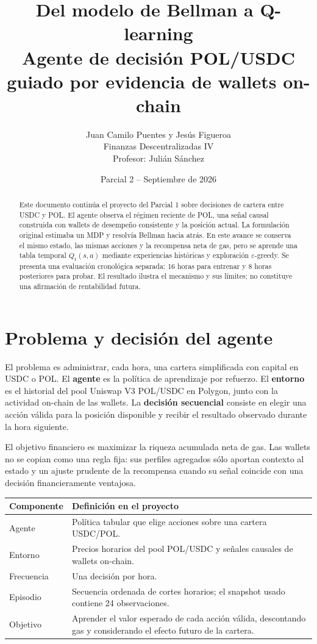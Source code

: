 \documentclass[12pt,letterpaper]{article}
\title{\textbf{Del modelo de Bellman a Q-learning}\\[0.4em]
\large Agente de decisión POL/USDC guiado por evidencia de wallets on-chain}
\author{Juan Camilo Puentes y Jesús Figueroa\\
Finanzas Descentralizadas IV\\
Profesor: Julián Sánchez}
\date{Parcial 2 -- Septiembre de 2026}
\begin{document}
\maketitle

\begin{abstract}
Este documento continúa el proyecto del Parcial 1 sobre decisiones de cartera
entre USDC y POL. El agente observa el régimen reciente de POL, una señal
causal construida con wallets de desempeño consistente y la posición actual.
La formulación original estimaba un MDP y resolvía Bellman hacia atrás. En este
avance se conserva el mismo estado, las mismas acciones y la recompensa neta de
gas, pero se aprende una tabla temporal $Q_t(s,a)$ mediante experiencias
históricas y exploración $\varepsilon$-greedy. Se presenta una evaluación
cronológica separada: 16 horas para entrenar y 8 horas posteriores para probar.
El resultado ilustra el mecanismo y sus límites; no constituye una afirmación de
rentabilidad futura.
\end{abstract}

\section{Problema y decisión del agente}

El problema es administrar, cada hora, una cartera simplificada con capital en
USDC o POL. El \textbf{agente} es la política de aprendizaje por refuerzo. El
\textbf{entorno} es el historial del pool Uniswap V3 POL/USDC en Polygon,
junto con la actividad on-chain de las wallets. La \textbf{decisión secuencial}
consiste en elegir una acción válida para la posición disponible y recibir el
resultado observado durante la hora siguiente.

El objetivo financiero es maximizar la riqueza acumulada neta de gas. Las
wallets no se copian como una regla fija: sus perfiles agregados sólo aportan
contexto al estado y un ajuste prudente de la recompensa cuando su señal coincide
con una decisión financieramente ventajosa.

\begin{center}
\begin{tabularx}{0.92\linewidth}{p{3cm}Y}
\toprule
\textbf{Componente} & \textbf{Definición en el proyecto}\\
\midrule
Agente & Política tabular que elige acciones sobre una cartera USDC/POL.\\
Entorno & Precios horarios del pool POL/USDC y señales causales de wallets on-chain.\\
Frecuencia & Una decisión por hora.\\
Episodio & Secuencia ordenada de cortes horarios; el snapshot usado contiene 24 observaciones.\\
Objetivo & Aprender el valor esperado de cada acción válida, descontando gas y considerando el efecto futuro de la cartera.\\
\bottomrule
\end{tabularx}
\end{center}
\end{document}

